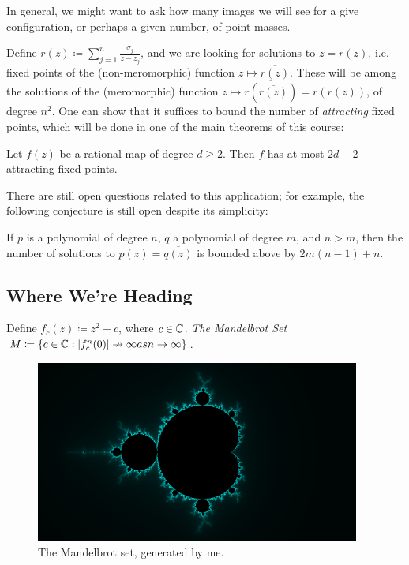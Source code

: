 \documentclass[10pt,a4paper]{article}
\begin{document}
In general, we might want to ask how many images we will see for a give configuration, or perhaps a given number, of point masses.

Define $r(z) \coloneqq \sum_{j=1}^n \frac{\sigma_j}{z-z_j}$, and we are looking for solutions to $z = \overline{r(z)}$, i.e. fixed points of the (non-meromorphic) function $z \mapsto \overline{r(z)}$. These will be among the solutions of the (meromorphic) function $z\mapsto \overline{r(\overline{r(z)})} = r(r(z))$, of degree $n^2$. One can show that it suffices to bound the number of \emph{attracting} fixed points, which will be done in one of the main theorems of this course:

\begin{theorem}
Let $f(z)$ be a rational map of degree $d \geq 2$. Then $f$ has at most $2d-2$ attracting fixed points.
\end{theorem}

There are still open questions related to this application; for example, the following conjecture is still open despite its simplicity:
\begin{conjecture}
If $p$ is a polynomial of degree $n$, $q$ a polynomial of degree $m$, and $n>m$, then the number of solutions to $p(z) = \overline{q(z)}$ is bounded above by $2m(n-1)+n$.
\end{conjecture}

\subsection{Where We're Heading}
Define $f_c(z) \coloneqq z^2+c$, where $c \in \mathbb{C}$. \emph{The Mandelbrot Set} $M \coloneqq \{c \in \mathbb{C} : |f_c^n(0)|\nrightarrow\infty as n\to\infty\}$.
\begin{figure}[H]
  \centering
  \includegraphics[width=0.95\textwidth]{compdyn05.png}
  \caption{The Mandelbrot set, generated by me.}
\end{figure}
\end{document}
